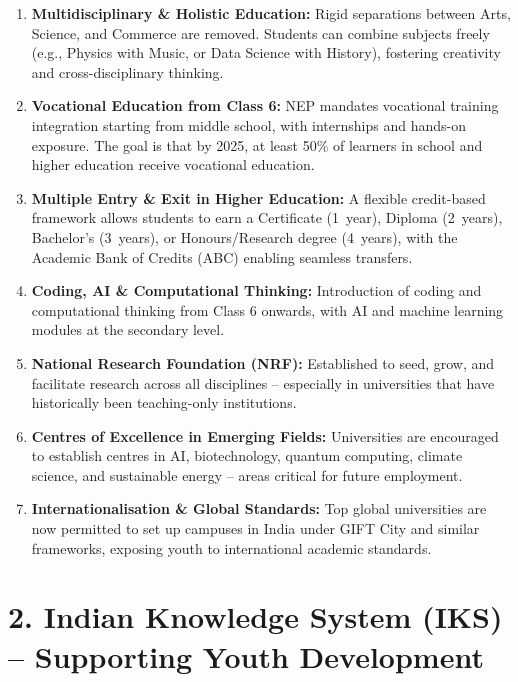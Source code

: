 \documentclass[11pt,a4paper]{article}
\begin{document}
\begin{enumerate}[label={\color{gold}\bfseries\arabic*.}]
  \item \textbf{Multidisciplinary \& Holistic Education:} Rigid separations between Arts, Science, and Commerce are removed. Students can combine subjects freely (e.g., Physics with Music, or Data Science with History), fostering creativity and cross-disciplinary thinking.

  \item \textbf{Vocational Education from Class 6:} NEP mandates vocational training integration starting from middle school, with internships and hands-on exposure. The goal is that by 2025, at least 50\% of learners in school and higher education receive vocational education.

  \item \textbf{Multiple Entry \& Exit in Higher Education:} A flexible credit-based framework allows students to earn a Certificate (1~year), Diploma (2~years), Bachelor's (3~years), or Honours/Research degree (4~years), with the Academic Bank of Credits (ABC) enabling seamless transfers.

  \item \textbf{Coding, AI \& Computational Thinking:} Introduction of coding and computational thinking from Class 6 onwards, with AI and machine learning modules at the secondary level.

  \item \textbf{National Research Foundation (NRF):} Established to seed, grow, and facilitate research across all disciplines -- especially in universities that have historically been teaching-only institutions.

  \item \textbf{Centres of Excellence in Emerging Fields:} Universities are encouraged to establish centres in AI, biotechnology, quantum computing, climate science, and sustainable energy -- areas critical for future employment.

  \item \textbf{Internationalisation \& Global Standards:} Top global universities are now permitted to set up campuses in India under GIFT City and similar frameworks, exposing youth to international academic standards.
\end{enumerate}

\vspace{0.15cm}
\section{2. Indian Knowledge System (IKS) -- Supporting Youth Development}
\end{document}
